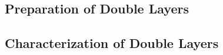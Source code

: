 \documentclass[\main/dresen_thesis.tex]{subfiles}
\renewcommand{\thisPath}{\main/chapters/doublelayers/experimentalMethods/}
\begin{document}
  \subsection{Preparation of Double Layers}
    
    \FloatBarrier

  \subsection{Characterization of Double Layers}
  
    \FloatBarrier
\end{document}
